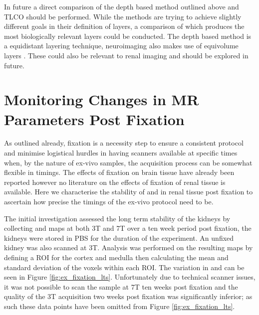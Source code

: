 In future a direct comparison of the depth based method outlined above and \ac{TLCO} should be performed. While the methods are trying to achieve slightly different goals in their definition of layers, a comparison of which produces the most biologically relevant layers could be conducted. The depth based method is a equidistant layering technique, neuroimaging also makes use of equivolume layers \cite{waehnert_anatomically_2014}. These could also be relevant to renal imaging and should be explored in future.

\section{Monitoring Changes in MR Parameters Post Fixation}
\label{sec:ex_tissue_fixation}
As outlined already, fixation is a necessity step to ensure a consistent protocol and minimise logistical hurdles in having scanners available at specific times when, by the nature of ex-vivo samples, the acquisition process can be somewhat flexible in timings. The effects of fixation on brain tissue have already been reported \cite{birkl_effects_2016, schmierer_quantitative_2008, shatil_quantitative_2018} however no literature on the effects of fixation of renal tissue is available. Here we characterise the stability of \tone and \ttwostar in renal tissue post fixation to ascertain how precise the timings of the ex-vivo protocol need to be.

The initial investigation assessed the long term stability of the kidneys by collecting \tone and \ttwostar maps at both 3T and 7T over a ten week period post fixation, the kidneys were stored in \ac{PBS} for the duration of the experiment. An unfixed kidney was also scanned at 3T. Analysis was performed on the resulting maps by defining a \ac{ROI} for the cortex and medulla then calculating the mean and standard deviation of the voxels within each \ac{ROI}. The variation in \tone and \ttwostar can be seen in Figure \ref{fig:ex_fixation_lts}. Unfortunately due to technical scanner issues, it was not possible to scan the sample at 7T ten weeks post fixation and the quality of the 3T \tone acquisition two weeks post fixation was significantly inferior; as such these data points have been omitted from Figure \ref{fig:ex_fixation_lts}.

